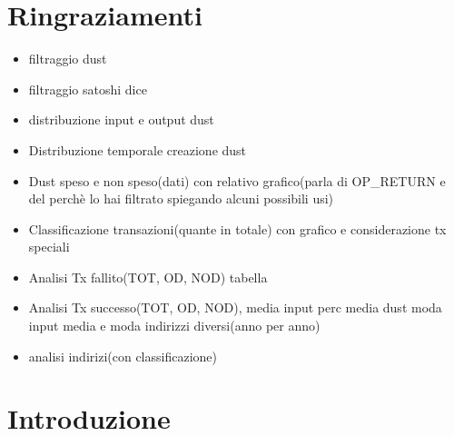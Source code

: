 \chapter*{Ringraziamenti} %
\begin{flushright}
\itshape 
\begin{itemize}
    \item filtraggio dust 
    \item filtraggio satoshi dice
    \item distribuzione input e output dust
    \item Distribuzione temporale creazione dust
    \item Dust speso e non speso(dati) con relativo grafico(parla di OP\_RETURN e del perchè lo hai filtrato spiegando alcuni possibili usi)
    \item Classificazione transazioni(quante in totale) con grafico e considerazione tx speciali
    \item Analisi Tx fallito(TOT, OD, NOD) tabella
    \item Analisi Tx successo(TOT, OD, NOD), media input perc media dust moda input media e moda indirizzi diversi(anno per anno)
    \item analisi indirizi(con classificazione)
\end{itemize}
\end{flushright}


\chapter{Introduzione}